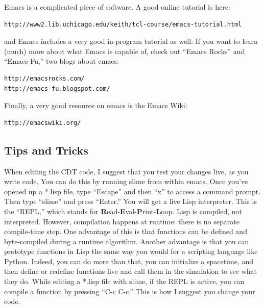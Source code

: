 \message{ !name(programmers_guide.tex)}\documentclass[12pt]{article}
\begin{document}
Emacs is a complicated piece of software. A good online tutorial is
here:
\begin{verbatim}
http://www2.lib.uchicago.edu/keith/tcl-course/emacs-tutorial.html
\end{verbatim}
and Emacs includes a very good in-program tutorial as well. If you want to learn (much) more about what Emacs is capable of, check out ``Emacs Rocks'' and ``Emacs-Fu,'' two blogs about emacs:
\begin{verbatim}
http://emacsrocks.com/
http://emacs-fu.blogspot.com/
\end{verbatim}
Finally, a very good resource on emacs is the Emacs Wiki:
\begin{verbatim}
http://emacswiki.org/
\end{verbatim}

\subsection{Tips and Tricks}

When editing the CDT code, I suggest that you test your changes live,
as you write code. You can do this by running slime from within
emacs. Once you've opened up a *.lisp file, type ``Escape'' and then
``x'' to access a command prompt. Then type ``slime'' and press
``Enter.'' You will get a live Lisp interpreter. This is the ``REPL,''
which stands for
\textbf{R}ead-\textbf{E}val-\textbf{P}rint-\textbf{L}oop. Lisp is
compiled, not interpreted. However, compilation happens at runtime:
there is no separate compile-time step. One advantage of this is that
functions can be defined and byte-compiled during a runtime
algorithm. Another advantage is that you can prototype functions in
Lisp the same way you would for a scripting language like
Python. Indeed, you can do more than that, you can initialize a
spacetime, and then define or redefine functions live and call them in
the simulation to see what they do. While editing a *.lisp file with
slime, if the REPL is active, you can compile a function by pressing
``C-c C-c.'' This is how I suggest you change your code.
\end{document}
